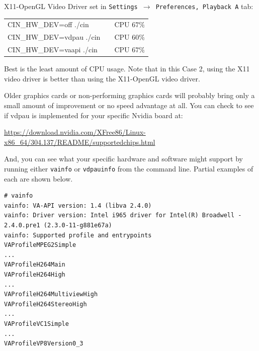 \noindent X11-OpenGL Video Driver set in \texttt{Settings $\rightarrow$ Preferences, Playback A} tab:

\begin{center}
	\begin{tabular}{lcr}
		CIN\_HW\_DEV=off ./cin & &CPU $67\%$ \\
		CIN\_HW\_DEV=vdpau ./cin & &CPU $60\%$ \\
		CIN\_HW\_DEV=vaapi ./cin & &CPU $67\%$ \\
	\end{tabular}
\end{center}

\noindent Best is the least amount of CPU usage. Note that in this Case 2, using the X11 video driver is better
than using the X11-OpenGL video driver.

Older graphics cards or non-performing graphics cards will probably bring only a small amount of improvement or no speed advantage at all.  You can check to see if vdpau is implemented for your specific Nvidia board at:

{\small \url{https://download.nvidia.com/XFree86/Linux-x86_64/304.137/README/supportedchips.html}}

And, you can see what your specific hardware and software might support by running either \texttt{vainfo} or \texttt{vdpauinfo} from the command line.  Partial examples of each are shown below.

\begin{lstlisting}[numbers=none]
# vainfo
vainfo: VA-API version: 1.4 (libva 2.4.0)
vainfo: Driver version: Intel i965 driver for Intel(R) Broadwell - 2.4.0.pre1 (2.3.0-11-g881e67a)
vainfo: Supported profile and entrypoints
VAProfileMPEG2Simple            		
...
VAProfileH264Main              
VAProfileH264High  
...
VAProfileH264MultiviewHigh 
VAProfileH264StereoHigh 
...
VAProfileVC1Simple 
...
VAProfileVP8Version0_3 
\end{lstlisting}

